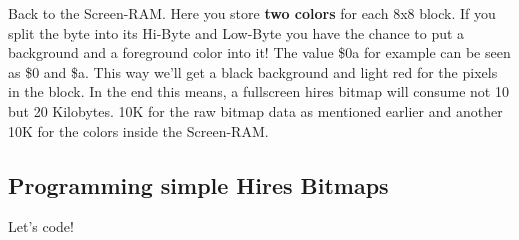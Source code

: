 Back to the Screen-RAM. Here you store \textbf{two colors} for each 8x8 block. If you split the byte into its Hi-Byte and Low-Byte you have the chance to put a background and a foreground color into it! The value \$0a for example can be seen as \$0 and \$a. This way we'll get a black background and light red for the pixels in the block. In the end this means, a fullscreen hires bitmap will consume not 10 but 20 Kilobytes. 10K for the raw bitmap data as mentioned earlier and another 10K for the colors inside the Screen-RAM.\\


\subsection*{Programming simple Hires Bitmaps}

Let's code!

